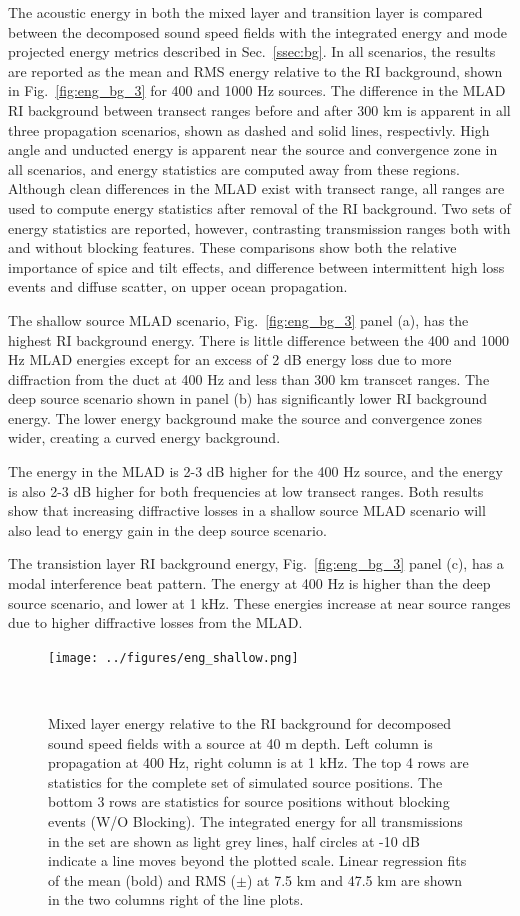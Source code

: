 \documentclass[preprint,NumberedRefs]{JASA}
\begin{document}
The acoustic energy in both the mixed layer and transition layer is compared between the decomposed sound speed fields with the integrated energy and mode projected energy metrics described in Sec.~\ref{ssec:bg}. In all scenarios, the results are reported as the mean and RMS energy relative to the RI background, shown in Fig.~\ref{fig:eng_bg_3} for 400 and 1000 Hz sources. The difference in the MLAD RI background between transect ranges before and after 300 km is apparent in all three propagation scenarios, shown as dashed and solid lines, respectivly. High angle and unducted energy is apparent near the source and convergence zone in all scenarios, and energy statistics are computed away from these regions. Although clean differences in the MLAD exist with transect range, all ranges are used to compute energy statistics after removal of the RI background. Two sets of energy statistics are reported, however, contrasting transmission ranges both with and without blocking features. These comparisons show both the relative importance of spice and tilt effects, and difference between intermittent high loss events and diffuse scatter, on upper ocean propagation.

The shallow source MLAD scenario, Fig.~\ref{fig:eng_bg_3} panel (a), has the highest RI background energy. There is little difference between the 400 and 1000 Hz MLAD energies except for an excess of 2 dB energy loss due to more diffraction from the duct at 400 Hz and less than 300 km transcet ranges. The deep source scenario shown in panel (b) has significantly lower RI background energy. The lower energy background make the source and convergence zones wider, creating a curved energy background.

The energy in the MLAD is 2-3 dB higher for the 400 Hz source, and the energy is also 2-3 dB higher for both frequencies at low transect ranges. Both results show that increasing diffractive losses in a shallow source MLAD scenario will also lead to energy gain in the deep source scenario.

The transistion layer RI background energy, Fig.~\ref{fig:eng_bg_3} panel (c), has a modal interference beat pattern. The energy at 400 Hz is higher than the deep source scenario, and lower at 1 kHz. These energies increase at near source ranges due to higher diffractive losses from the MLAD.

\begin{figure}
\texttt{[image: ../figures/eng\_shallow.png]}
    \caption{Mixed layer energy relative to the RI background for decomposed sound speed fields with a source at 40 m depth. Left column is propagation at 400 Hz, right column is at 1 kHz. The top 4 rows are statistics for the complete set of simulated source positions. The bottom 3 rows are statistics for source positions without blocking events (W/O Blocking). The integrated energy for all transmissions in the set are shown as light grey lines, half circles at -10 dB indicate a line moves beyond the plotted scale. Linear regression fits of the mean (bold) and RMS ($\pm$) at 7.5 km and 47.5 km are shown in the two columns right of the line plots.}
    \label{fig:shal_eng}
\end{figure}
\end{document}
